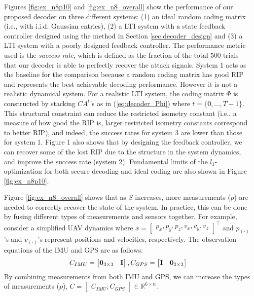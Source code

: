 \documentclass[journal]{IEEEtran}
\begin{document}
Figures \ref{fig:ex_n8p10} and \ref{fig:ex_n8_overall} show the performance of our proposed decoder on three different systems: (1) an ideal random coding matrix (i.e., with i.i.d. Gaussian entries), (2) a LTI system with a state feedback controller designed using the method in Section \ref{sec:decoder_design} and (3) a LTI system with a poorly designed feedback controller. 
The performance metric used is the \textit{success rate}, which is defined as the fraction of the total 500 trials that our decoder is able to perfectly recover the attack signals.
System 1 acts as the baseline for the comparison because a random coding matrix has good RIP and represents the best achievable decoding performance. However it is not a realistic dynamical system. For a realistic LTI system, the coding matrix $\Phi$ is constructed by stacking $CA^{t}$'s as in (\ref{eq:decoder_Phi}) where $t=\{ 0, ..., T-1\}$. This structural constraint can reduce the restricted isometry constant (i.e., a measure of how good the RIP is, larger restricted isometry constants correspond to better RIP), and indeed, the success rates for system 3 are lower than those for system 1. Figure 1 also shows that by designing the feedback controller, we can recover some of the lost RIP due to the structure in the system dynamics, and improve the success rate (system 2).
Fundamental limits of the $l_1$-optimization for both secure decoding and ideal coding are also shown in Figure \ref{fig:ex_n8p10}. 


Figure \ref{fig:ex_n8_overall} shows that as $S$ increases, more measurements ($p$) are needed to correctly recover the state of the system. In practice, this can be done by fusing different types of measurements and sensors together. For example, consider a simplified UAV dynamics where $ x = \begin{bmatrix} p_x, p_y, p_z, v_x, v_y, v_z \end{bmatrix}^\top$ and $p_{(\cdot)}$'s and $v_{(\cdot)}$'s represent positions and velocities, respectively. The observation equations of the IMU and GPS are as follows:
\begin{equation}
C_{IMU} =\begin{bmatrix} {\bf 0}_{3\times 3} & {\bf I} \end{bmatrix}, C_{GPS} = \begin{bmatrix} {\bf I} & {\bf 0}_{3\times 3} \end{bmatrix} \nonumber
\end{equation}
By combining measurements from both IMU and GPS, we can increase the types of measurements ($p$), $C = \begin{bmatrix} C_{IMU} ; C_{GPS}\end{bmatrix} \in \mathbb{R}^{6 \times n}$.
\end{document}
